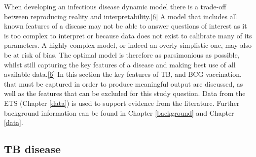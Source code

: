 \documentclass[11pt,twoside]{bristolthesis}
\begin{document}
  When developing an infectious disease dynamic model there is a trade-off between reproducing reality and interpretability.{[}\protect\hyperlink{ref-Anderson1991}{6}{]} A model that includes all known features of a disease may not be able to answer questions of interest as it is too complex to interpret or because data does not exist to calibrate many of its parameters. A highly complex model, or indeed an overly simplistic one, may also be at risk of bias. The optimal model is therefore as parsimonious as possible, whilst still capturing the key features of a disease and making best use of all available data.{[}\protect\hyperlink{ref-Anderson1991}{6}{]} In this section the key features of TB, and BCG vaccination, that must be captured in order to produce meaningful output are discussed, as well as the features that can be excluded for this study question. Data from the ETS (Chapter \ref{data}) is used to support evidence from the literature. Further background information can be found in Chapter \ref{background} and Chapter \ref{data}.
  
  \hypertarget{tb-disease}{%
  \subsection{TB disease}\label{tb-disease}}
  
\end{document}
